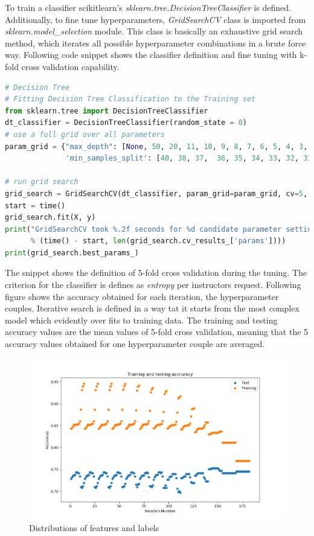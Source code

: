 \documentclass[11pt]{article}
\begin{document}
To train a classifier scikitlearn's \emph{sklearn.tree.DecisionTreeClassifier} is defined. Additionally, to fine tune hyperparameters, \emph{GridSearchCV} class is imported from \emph{sklearn.model\_selection} module. This class is basically an exhaustive grid search method, which iterates all possible hyperparameter combinations in a brute force way. Following code snippet shows the classifier definition and fine tuning with k-fold cross validation capability. 

\begin{lstlisting}[language=Python, basicstyle=\tiny, caption=Python code snippet for fine tuning the \underline{Decision Tree } classifier]
# Decision Tree
# Fitting Decision Tree Classification to the Training set
from sklearn.tree import DecisionTreeClassifier
dt_classifier = DecisionTreeClassifier(random_state = 0)
# use a full grid over all parameters
param_grid = {"max_depth": [None, 50, 20, 11, 10, 9, 8, 7, 6, 5, 4, 3, 2],
              'min_samples_split': [40, 38, 37,  36, 35, 34, 33, 32, 31, 30, 20, 10, 9, 8]}

# run grid search
grid_search = GridSearchCV(dt_classifier, param_grid=param_grid, cv=5, n_jobs = -1, return_train_score=True)
start = time()
grid_search.fit(X, y)
print("GridSearchCV took %.2f seconds for %d candidate parameter settings."
      % (time() - start, len(grid_search.cv_results_['params'])))
print(grid_search.best_params_)
\end{lstlisting}

The snippet shows the definition of 5-fold cross validation during the tuning. The criterion for the classifier is defines as \emph{entropy} per instructors request. Following figure shows the accuracy obtained for each iteration, the hyperparameter couples. Iterative search is defined in a way tat it starts from the most complex model which evidently over fits to training data. The training and testing accuracy values are the mean values of 5-fold cross validation, meaning that the 5 accuracy values obtained for one hyperparameter couple are averaged.\medskip

\begin{figure}[H]
\centering
\includegraphics[width=0.85\columnwidth]{pics/q2_dt.png}
\captionsetup{justification=centering}
\caption{Distributions of features and labels}
\label{fig:q2_dt}
\end{figure}
\end{document}
